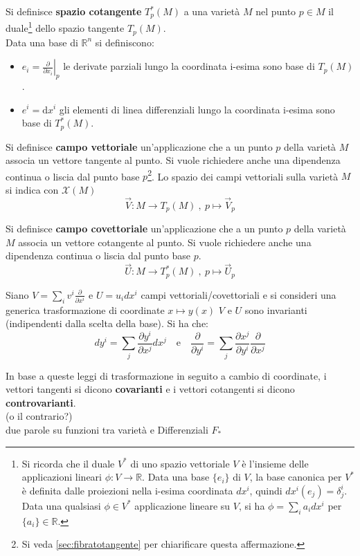 Si definisce \textbf{spazio cotangente} $T_p^*(M)$ a una varietà $M$ nel punto
$p \in M$ il duale\footnote{Si ricorda che il duale $V^*$ di uno spazio vettoriale $V$ è l'insieme
delle applicazioni lineari $\phi : V \to \mathbb{R}$. Data una base $\{e_i\}$ di $V$,
la base canonica per $V^*$ è definita dalle proiezioni nella i-esima coordinata $dx^i$,
quindi $dx^i(e_j)=\delta^i_j$. Data una qualsiasi $\phi\in V^*$ applicazione lineare
su $V$, si ha $\phi = \sum_i a_i dx^i$ per $\{a_i\}\in\mathbb{R}$. }
dello spazio tangente $T_p(M)$.\\

Data una base di $\mathbb{R}^n$ si definiscono:
\begin{itemize}
   \item $ e_i = \left. \frac{\partial}{\partial x_i}\right |_p $
      le derivate parziali lungo la coordinata i-esima sono base di $T_p(M)$.
   \item $ e^i = \mathrm{d}x^i $ gli elementi di linea differenziali lungo la
      coordinata i-esima sono base di $T_p^*(M)$.
\end{itemize}

Si definisce \textbf{campo vettoriale} un'applicazione che a un punto $p$
della varietà $M$ associa un vettore tangente al punto. Si vuole richiedere anche
una dipendenza continua o liscia dal punto base $p$\footnote{Si veda \ref{sec:fibratotangente}
per chiarificare questa affermazione.}.
Lo spazio dei campi vettoriali sulla varietà $M$ si indica con $\mathcal{X}(M)$
$$ \vec V : M \to T_p(M) \: ,\: p \mapsto \vec V _p $$

Si definisce \textbf{campo covettoriale} un'applicazione che a un punto $p$
della varietà $M$ associa un vettore cotangente al punto. Si vuole richiedere anche
una dipendenza continua o liscia dal punto base $p$.
$$ \vec U : M \to T_p^*(M) \: ,\: p \mapsto \vec U _p $$

Siano $V = \sum_i v^i\frac{\partial}{\partial x^i}$ e $U = u_i dx^i$ campi
vettoriali/covettoriali e si consideri una generica trasformazione di coordinate
$x \mapsto y(x)$ $V$ e $U$ sono invarianti (indipendenti dalla scelta della base).
Si ha che:
$$
   dy^i = \sum_j \frac{\partial y^i}{\partial x^j} dx^j \mathrm{\quad e \quad}
   \frac{\partial}{\partial y^i} = \sum_j \frac{\partial x^j}{\partial y^i}
      \frac{\partial }{\partial x^j}
$$

In base a queste leggi di trasformazione in seguito a cambio di coordinate,
i vettori tangenti si dicono \textbf{covarianti} e i vettori cotangenti
si dicono \textbf{controvarianti}.\\
(o il contrario?)\\
due parole su funzioni tra varietà e Differenziali $F_*$\\

